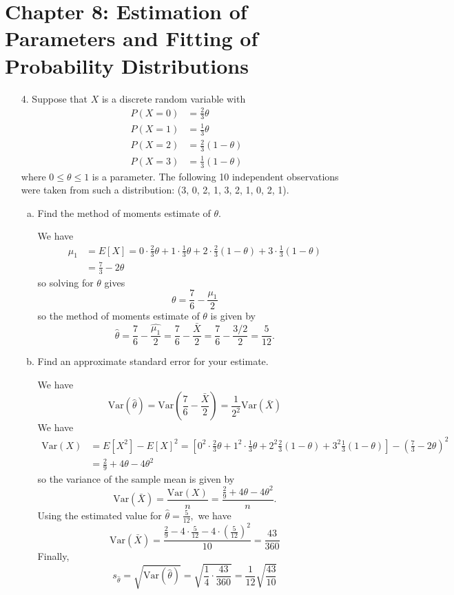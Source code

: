 \documentclass{article}
\newcommand{\var}{\mathrm{Var}}
\begin{document}
\section*{Chapter 8: Estimation of Parameters and Fitting of Probability Distributions}

\begin{itemize}
	\item[4.] Suppose that $X$ is a discrete random variable with 
				\begin{align*}
					P(X=0)&=\frac{2}{3}\theta \\
					P(X=1) &= \frac{1}{3}\theta \\
					P(X=2) &= \frac{2}{3}(1-\theta) \\
					P(X=3) &= \frac{1}{3}(1-\theta)
				\end{align*}
				where $0\le\theta\le1$ is a parameter. The following 10 independent observations were taken from such a distribution: (3, 0, 2, 1, 3, 2, 1, 0, 2, 1).
		\begin{enumerate}[(a)]
			\item Find the method of moments estimate of $\theta.$
				\begin{soln}
					We have 
					\begin{align*}
						\mu_1 &= E[X] = 0\cdot\frac{2}{3}\theta + 1\cdot\frac{1}{3}\theta+2\cdot\frac{2}{3}(1-\theta) + 3\cdot\frac{1}{3}(1-\theta) \\ 
						&= \frac{7}{3}-2\theta
					\end{align*} so solving for $\theta$ gives \[\theta=\frac{7}{6}-\frac{\mu_1}{2}\] so the method of moments estimate of $\theta$ is given by \[\hat{\theta}=\frac{7}{6}-\frac{\hat{\mu_1}}{2} = \frac{7}{6}-\frac{\bar{X}}{2} = \frac{7}{6}-\frac{3/2}{2} = \boxed{\frac{5}{12}.}\] 
				\end{soln}

			\item Find an approximate standard error for your estimate.
				\begin{soln}
					We have \[\var(\hat{\theta})=\var\left( \frac{7}{6}-\frac{\bar{X}}{2} \right) = \frac{1}{2^2}\var(\bar{X})\] We have 
					\begin{align*}
						\var(X)&=E[X^2]-E[X]^2=\left[ 0^2\cdot\frac{2}{3}\theta+1^2\cdot\frac{1}{3}\theta+2^2\frac{2}{3}(1-\theta) + 3^2\frac{1}{3}(1-\theta) \right] - \left( \frac{7}{3}-2\theta \right)^2 \\
						&= \frac{2}{9}+4\theta-4\theta^2
					\end{align*}
					so the variance of the sample mean is given by \[\var(\bar{X})=\frac{\var(X)}{n}=\frac{\frac{2}{9}+4\theta-4\theta^2}{n}. \] Using the estimated value for $\hat{\theta}=\frac{5}{12},$ we have \[\var(\bar{X})=\frac{\frac{2}{9}-4\cdot\frac{5}{12}-4\cdot\left( \frac{5}{12} \right)^2}{10} = \frac{43}{360}\] Finally, \[s_{\hat{\theta}}=\sqrt{\var(\hat{\theta})}=\sqrt{\frac{1}{4}\cdot\frac{43}{360}} = \boxed{\frac{1}{12}\sqrt{\frac{43}{10}}}\]
				\end{soln}


\end{enumerate}
\end{itemize}
\end{document}
